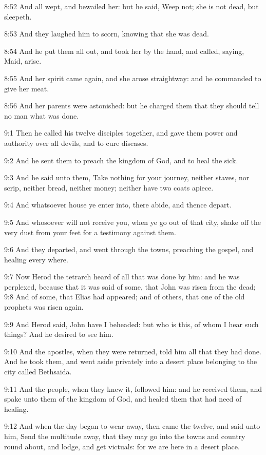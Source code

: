 8:52 And all wept, and bewailed her: but he said, Weep not; she is not dead, but sleepeth.

8:53 And they laughed him to scorn, knowing that she was dead.

8:54 And he put them all out, and took her by the hand, and called, saying, Maid, arise.

8:55 And her spirit came again, and she arose straightway: and he commanded to give her meat.

8:56 And her parents were astonished: but he charged them that they should tell no man what was done.

9:1 Then he called his twelve disciples together, and gave them power and authority over all devils, and to cure diseases.

9:2 And he sent them to preach the kingdom of God, and to heal the sick.

9:3 And he said unto them, Take nothing for your journey, neither staves, nor scrip, neither bread, neither money; neither have two coats apiece.

9:4 And whatsoever house ye enter into, there abide, and thence depart.

9:5 And whosoever will not receive you, when ye go out of that city, shake off the very dust from your feet for a testimony against them.

9:6 And they departed, and went through the towns, preaching the gospel, and healing every where.

9:7 Now Herod the tetrarch heard of all that was done by him: and he was perplexed, because that it was said of some, that John was risen from the dead; 9:8 And of some, that Elias had appeared; and of others, that one of the old prophets was risen again.

9:9 And Herod said, John have I beheaded: but who is this, of whom I hear such things? And he desired to see him.

9:10 And the apostles, when they were returned, told him all that they had done. And he took them, and went aside privately into a desert place belonging to the city called Bethsaida.

9:11 And the people, when they knew it, followed him: and he received them, and spake unto them of the kingdom of God, and healed them that had need of healing.

9:12 And when the day began to wear away, then came the twelve, and said unto him, Send the multitude away, that they may go into the towns and country round about, and lodge, and get victuals: for we are here in a desert place.

